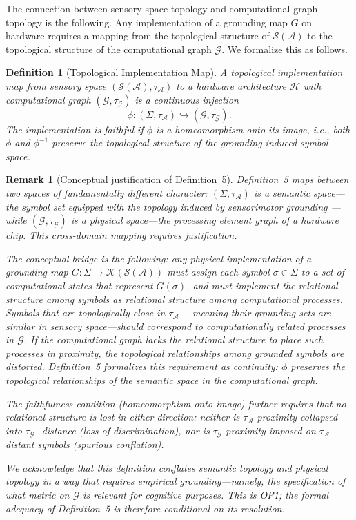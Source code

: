\documentclass[12pt]{article}
\newtheorem{definition}{Definition}
\newtheorem{remark}{Remark}
\begin{document}
The connection between sensory space topology and computational graph
topology is the following. Any implementation of a grounding map $G$ on
hardware requires a mapping from the topological structure of
$\mathcal{S}(\mathcal{A})$ to the topological structure of the
computational graph $\mathcal{G}$. We formalize this as follows.

\begin{definition}[Topological Implementation Map]
A \emph{topological implementation map} from sensory space
$(\mathcal{S}(\mathcal{A}), \tau_{\mathcal{A}})$ to a hardware
architecture $\mathcal{H}$ with computational graph
$(\mathcal{G}, \tau_{\mathcal{G}})$ is a continuous injection
\[
\phi: (\Sigma, \tau_{\mathcal{A}}) \hookrightarrow
      (\mathcal{G}, \tau_{\mathcal{G}}).
\]
The implementation is \emph{faithful} if $\phi$ is a homeomorphism
onto its image, i.e., both $\phi$ and $\phi^{-1}$ preserve the
topological structure of the grounding-induced symbol space.
\end{definition}

\begin{remark}[Conceptual justification of Definition~5]
Definition~5 maps between two spaces of fundamentally different
character: $(\Sigma, \tau_{\mathcal{A}})$ is a semantic space---the
symbol set equipped with the topology induced by sensorimotor grounding
---while $(\mathcal{G}, \tau_{\mathcal{G}})$ is a physical space---the
processing element graph of a hardware chip. This cross-domain mapping
requires justification.

The conceptual bridge is the following: any physical implementation
of a grounding map $G: \Sigma \to \mathcal{K}(\mathcal{S}(\mathcal{A}))$
must assign each symbol $\sigma \in \Sigma$ to a set of computational
states that represent $G(\sigma)$, and must implement the relational
structure among symbols as relational structure among computational
processes. Symbols that are topologically close in $\tau_{\mathcal{A}}$
---meaning their grounding sets are similar in sensory space---should
correspond to computationally related processes in $\mathcal{G}$.
If the computational graph lacks the relational structure to place such
processes in proximity, the topological relationships among grounded
symbols are distorted. Definition~5 formalizes this requirement as
continuity: $\phi$ preserves the topological relationships of the
semantic space in the computational graph.

The faithfulness condition (homeomorphism onto image) further requires
that no relational structure is lost in either direction: neither is
$\tau_{\mathcal{A}}$-proximity collapsed into $\tau_{\mathcal{G}}$-
distance (loss of discrimination), nor is $\tau_{\mathcal{G}}$-proximity
imposed on $\tau_{\mathcal{A}}$-distant symbols (spurious conflation).

We acknowledge that this definition conflates semantic topology and
physical topology in a way that requires empirical grounding---namely,
the specification of what metric on $\mathcal{G}$ is relevant for
cognitive purposes. This is OP1; the formal adequacy of Definition~5
is therefore conditional on its resolution.
\end{remark}
\end{document}
